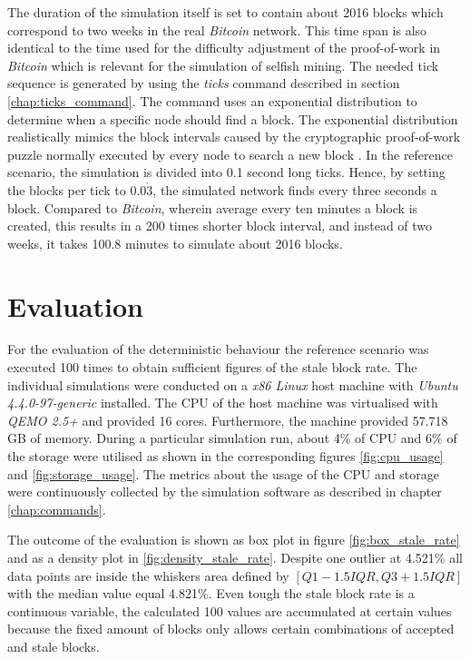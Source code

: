 The duration of the simulation itself is set to contain about 2016 blocks which correspond to two weeks in the real \textit{Bitcoin} network.
This time span is also identical to the time used for the difficulty adjustment of the proof-of-work in \textit{Bitcoin} which is relevant for the simulation of selfish mining. 
The needed tick sequence is generated by using the \textit{ticks} command described in section \ref{chap:ticks_command}.
The command uses an exponential distribution to determine when a specific node should find a block. 
The exponential distribution realistically mimics the block intervals caused by the cryptographic proof-of-work puzzle normally executed by every node to search a new block \cite{nakamoto2008bitcoin, decker2013information, eyal2014majority}.
In the reference scenario, the simulation is divided into 0.1 second long ticks.
Hence, by setting the blocks per tick to $0.0\dot{3}$, the simulated network finds every three seconds a block.
Compared to \textit{Bitcoin}, wherein average every ten minutes a block is created, this results in a 200 times shorter block interval, and instead of two weeks, it takes 100.8 minutes to simulate about 2016 blocks.

\section{Evaluation}
\label{chap:evaluation}

For the evaluation of the deterministic behaviour the reference scenario was executed 100 times to obtain sufficient figures of the stale block rate.
The individual simulations were conducted on a \textit{x86 Linux} host machine with \textit{Ubuntu 4.4.0-97-generic} installed.
The CPU of the host machine was virtualised with \textit{QEMO 2.5+} and provided 16 cores.
Furthermore, the machine provided 57.718 GB of memory.
During a particular simulation run, about 4\% of CPU and 6\% of the storage were utilised as shown in the corresponding figures \ref{fig:cpu_usage} and \ref{fig:storage_usage}.
The metrics about the usage of the CPU and storage were continuously collected by the simulation software as described in chapter \ref{chap:commands}.

The outcome of the evaluation is shown as box plot in figure \ref{fig:box_stale_rate} and as a density plot in \ref{fig:density_stale_rate}.
Despite one outlier at 4.521\% all data points are inside the whiskers area defined by $[Q1 - 1.5IQR, Q3 + 1.5IQR]$ with the median value equal 4.821\%.
Even tough the stale block rate is a continuous variable, the calculated 100 values are accumulated at certain values because the fixed amount of blocks only allows certain combinations of accepted and stale blocks.

